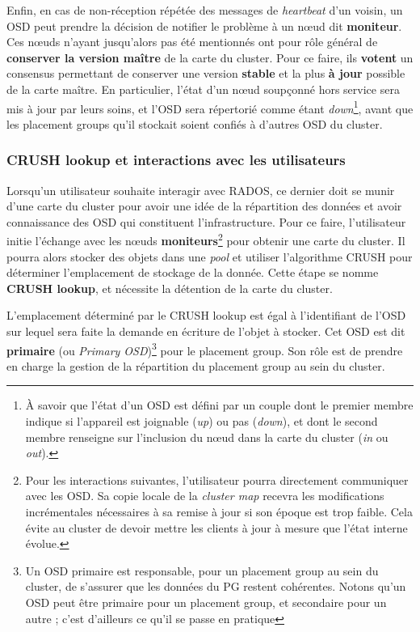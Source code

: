 Enfin, en cas de non-réception répétée des messages de \emph{heartbeat} d'un voisin, un OSD peut prendre la décision de notifier le problème à un nœud dit \textbf{moniteur}. Ces nœuds n'ayant jusqu'alors pas été mentionnés ont pour rôle général de \textbf{conserver la version maître} de la carte du cluster. Pour ce faire, ils \textbf{votent} un consensus permettant de conserver une version \textbf{stable} et la plus \textbf{à jour} possible de la carte maître. En particulier, l'état d'un nœud soupçonné \og{}hors service\fg{} sera mis à jour par leurs soins, et l'OSD sera répertorié comme étant \emph{down}\footnote{À savoir que l'état d'un OSD est défini par un couple dont le premier membre indique si l'appareil est joignable (\emph{up}) ou pas (\emph{down}), et dont le second membre renseigne sur l'inclusion du nœud dans la carte du cluster (\emph{in} ou \emph{out}).}, avant que les placement groups qu'il stockait soient confiés à d'autres OSD du cluster.

\subsubsection{\og{}CRUSH lookup\fg{} et interactions avec les utilisateurs}

Lorsqu'un utilisateur souhaite interagir avec RADOS, ce dernier doit se munir d'une carte du cluster pour avoir une idée de la répartition des données et avoir connaissance des OSD qui constituent l'infrastructure. Pour ce faire, l'utilisateur initie l'échange avec les nœuds \textbf{moniteurs}\footnote{Pour les interactions suivantes, l'utilisateur pourra directement communiquer avec les OSD. Sa copie locale de la \emph{cluster map} recevra les modifications incrémentales nécessaires à sa remise à jour si son époque est trop faible. Cela évite au cluster de devoir mettre les clients à jour à mesure que l'état interne évolue.} pour obtenir une carte du cluster. Il pourra alors stocker des objets dans une \emph{pool} et utiliser l'algorithme CRUSH pour déterminer l'emplacement de stockage de la donnée. Cette étape se nomme \textbf{CRUSH lookup}, et nécessite la détention de la carte du cluster. 

L'emplacement déterminé par le CRUSH lookup est égal à l'identifiant de l'OSD sur lequel sera faite la demande en écriture de l'objet à stocker. Cet OSD est dit \textbf{primaire} (ou \emph{Primary OSD})\footnote{Un OSD primaire est responsable, pour un placement group au sein du cluster, de s'assurer que les données du PG restent cohérentes. Notons qu'un OSD peut être primaire pour un placement group, et secondaire pour un autre ; c'est d'ailleurs ce qu'il se passe en pratique} pour le placement group. Son rôle est de prendre en charge la gestion de la répartition du placement group au sein du cluster. 

